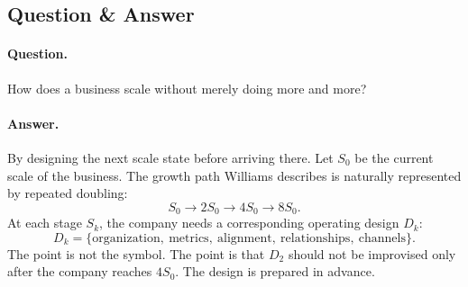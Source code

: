\subsection{Question \& Answer}

\paragraph{Question.} How does a business scale without merely doing more and more?

\paragraph{Answer.} By designing the next scale state before arriving there. Let \(S_0\) be the current scale of the business. The growth path Williams describes is naturally represented by repeated doubling:
\begin{equation}
S_0 \longrightarrow 2S_0 \longrightarrow 4S_0 \longrightarrow 8S_0.
\end{equation}
At each stage \(S_k\), the company needs a corresponding operating design \(D_k\):
\begin{equation}
D_k =
\{\mathrm{organization},\ \mathrm{metrics},\ \mathrm{alignment},\ \mathrm{relationships},\ \mathrm{channels}\}.
\end{equation}
The point is not the symbol. The point is that \(D_2\) should not be improvised only after the company reaches \(4S_0\). The design is prepared in advance.

\begin{figure}
\centering
{}
\end{figure}

